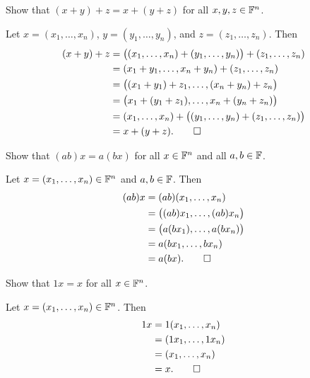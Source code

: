 \begin{exc}
\begin{exercise}
Show that $(x+y)+z=x+(y+z)$ for all $x,y,z\in\mathbb{F}^n$.
\end{exercise}
\begin{solution}
Let $x=(x_1,\dots,x_n)$, $y=(y_1,\dots,y_n)$, and $z=(z_1,\dots,z_n)$. Then
\begin{align*}
(x+y)+z &= \bigl((x_1,\dots,x_n)+(y_1,\dots,y_n)\bigr)+(z_1,\dots,z_n)\\
  &= (x_1+y_1,\dots,x_n+y_n)+(z_1,\dots,z_n)\\
  &= \bigl((x_1+y_1)+z_1,\dots,(x_n+y_n)+z_n\bigr)\\
  &= \bigl(x_1+(y_1+z_1),\dots,x_n+(y_n+z_n)\bigr)\\
  &= (x_1,\dots,x_n)+\bigl((y_1,\dots,y_n)+(z_1,\dots,z_n)\bigr)\\
  &= x+(y+z). \qedhere
\end{align*}
\end{solution}

\begin{exercise}
Show that $(ab)x=a(bx)$ for all $x\in\mathbb{F}^n$ and all $a,b\in\mathbb{F}$.
\end{exercise}
\begin{solution}
Let $x=(x_1,\dots,x_n)\in\mathbb{F}^n$ and $a,b\in\mathbb{F}$. Then
\begin{align*}
(ab)x &= (ab)(x_1,\dots,x_n)\\
      &= \bigl((ab)x_1,\dots,(ab)x_n\bigr)\\
      &= \bigl(a(bx_1),\dots,a(bx_n)\bigr)\\
      &= a(bx_1,\dots,bx_n)\\
      &= a(bx). \qedhere
\end{align*}
\end{solution}

\begin{exercise}
Show that $1x=x$ for all $x\in\mathbb{F}^n$.
\end{exercise}
\begin{solution}
Let $x=(x_1,\dots,x_n)\in\mathbb{F}^n$. Then
\begin{align*}
1x &= 1(x_1,\dots,x_n)\\
   &= (1x_1,\dots,1x_n)\\
   &= (x_1,\dots,x_n)\\
   &= x. \qedhere
\end{align*}
\end{solution}


\end{exc}
